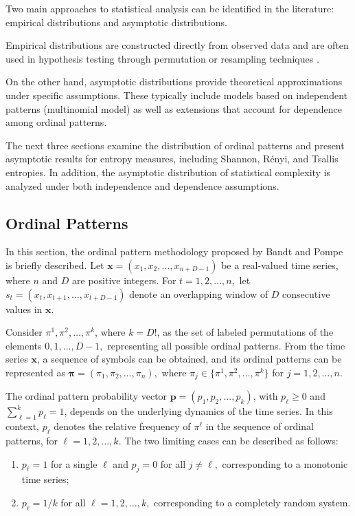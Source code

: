 \documentclass[12pt,a4paper]{article}
\begin{document}
Two main approaches to statistical analysis can be identified in the literature: empirical distributions and asymptotic distributions.

Empirical distributions are constructed directly from observed data and are often used in hypothesis testing through permutation or resampling techniques \cite{Chagas2022a, DeMicco2008, Larrondo2005, Larrondo2006}. 

On the other hand, asymptotic distributions provide theoretical approximations under specific assumptions. These typically include models based on independent patterns (multinomial model) as well as extensions that account for dependence among ordinal patterns. 

The next three sections examine the distribution of ordinal patterns and present asymptotic results for entropy measures, including Shannon, R\'enyi, and Tsallis entropies. In addition, the asymptotic distribution of statistical complexity is analyzed under both independence and dependence assumptions.

\subsection{Ordinal Patterns} 
In this section, the ordinal pattern methodology proposed by Bandt and Pompe is briefly described. Let $\mathbf{x}=(x_1, x_2, \dots, x_{n+D-1})$ be a real-valued time series, where $n$ and $D$ are positive integers. For $t=1,2,\dots,n,$ let $s_t=(x_t,x_{t+1},\dots,x_{t+D-1})$ denote an overlapping window of $D$ consecutive values in $\mathbf{x}.$ 

Consider $\pi^1,\pi^2,\dots,\pi^k$, where $k=D!$, as the set of labeled permutations of the elements $0,1,\dots,D-1,$ representing all possible ordinal patterns. From the time series $\mathbf{x}$, a sequence of symbols can be obtained, and its ordinal patterns can be represented as $\boldsymbol{\pi}= (\pi_1,\pi_2,\dots,\pi_n),$ where $\pi_j \in \{\pi^1,\pi^2,\dots,\pi^k\}$ for $j=1,2,\dots, n.$

The ordinal pattern probability vector $\mathbf{p} = (p_1, p_2, \dots, p_k)$, with $p_\ell \ge 0$ and $\sum_{\ell=1}^k p_\ell = 1$, depends on the underlying dynamics of the time series. In this context, $p_\ell$ denotes the relative frequency of $\pi^\ell$ in the sequence of ordinal patterns, for $\ell = 1,2,\dots,k.$ The two limiting cases can be described as follows:
\begin{enumerate}[label=\roman*.]
	\item $p_\ell =1$ for a single $\ell$ and $p_j =0$ for all $j \neq \ell,$ corresponding to a monotonic time series;
	\item $p_\ell =1/k$ for all $\ell = 1,2,\dots,k,$ corresponding to a completely random system. 
\end{enumerate}
\end{document}
